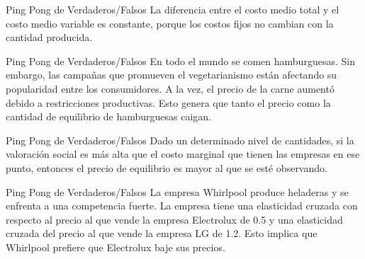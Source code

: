 \documentclass{beamer}
\begin{document}
\begin{frame}{Ping Pong de Verdaderos/Falsos}
    \centering
    La diferencia entre el costo medio total y el costo medio variable es constante, porque los costos fijos no cambian con la cantidad producida.
\end{frame}


\begin{frame}{Ping Pong de Verdaderos/Falsos}
    \centering
    En todo el mundo se comen hamburguesas. Sin embargo, las campañas que promueven el vegetarianismo están afectando su popularidad entre los consumidores. A la vez, el precio de la carne aumentó debido a restricciones productivas. Esto genera que tanto el precio como la cantidad de equilibrio de hamburguesas caigan. 
\end{frame}

\begin{frame}{Ping Pong de Verdaderos/Falsos}
    \centering
    Dado un determinado nivel de cantidades, si la valoración social es más alta que el costo marginal que tienen las empresas en ese punto, entonces el precio de equilibrio es mayor al que se esté observando.
\end{frame}

\begin{frame}{Ping Pong de Verdaderos/Falsos}
    \centering
    La empresa Whirlpool produce heladeras y se enfrenta a una competencia fuerte. La empresa tiene una elasticidad cruzada con respecto al precio al que vende la empresa Electrolux de 0.5 y una elasticidad cruzada del precio al que vende la empresa LG de 1.2. Esto implica que Whirlpool prefiere que Electrolux baje sus precios.
\end{frame}
\end{document}
